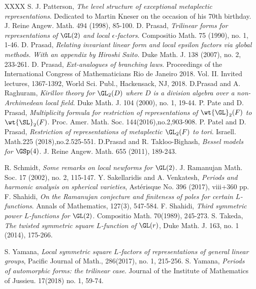 \documentclass[11pt,reqno]{amsart}
\theoremstyle{plain}
\theoremstyle{remark} \newtheorem{remark}[thm]{Remark}
\theoremstyle{definition} \newtheorem{exercise}[thm]{Exercise}
\theoremstyle{definition} \newtheorem{example}[thm]{Example} \newtheorem{condition}[thm]{Condition}
\numberwithin{equation}{section}
\renewcommand{\-}{\text{--}}
\begin{document}
\begin{thebibliography}{XXXX}
S. J. Patterson, \emph{The level structure of exceptional metaplectic representations}.
Dedicated to Martin Kneser on the occasion of his 70th birthday.
J. Reine Angew. Math. 494 (1998), 85-100.
D. Prasad, \emph{
Trilinear forms for representations of $\GL(2)$ and local $\epsilon$-factors}.
Compositio Math. 75 (1990), no. 1, 1-46.
 D. Prasad, {\em Relating invariant linear form and local epsilon factors via global methods. With an appendix by Hiroshi Saito.} Duke Math. J. 138 (2007), no. 2, 233-261.
D. Prasad, \emph{Ext-analogues of branching laws}.  Proceedings of the International Congress of Mathematicians Rio de Janeiro 2018. Vol. II. Invited lectures, 1367-1392, World Sci. Publ., Hackensack, NJ, 2018.
D.Prasad and A. Raghuram,\emph{
Kirillov theory for $\GL_2(D)$ where $D$ is a division algebra over a non-Archimedean local field}. Duke Math. J. 104 (2000), no. 1, 19-44.
P. Pate and D. Prasad, \emph{Multiplicity formula for restriction of representations of $\wt{\GL}_2(F)$ to $\wt{\SL}_2(F)$}. Proc. Amer.  Math. Soc. 144(2016),no.2,903-908.
P. Patel and D. Prasad, \emph{Restriction of representations of metaplectic $\GL_2(F)$ to tori}. Israell. Math.225 (2018),no.2.525-551.
D.Prasad and R. Takloo-Bighash,
\emph{Bessel models for $\GSp(4)$}. 
J. Reine Angew. Math. 655 (2011), 189-243.

R. Schmidt, \emph{Some remarks on local newforms for $\GL(2)$}. 
J. Ramanujan Math. Soc. 17 (2002), no. 2, 115-147.
 Y. Sakellaridis and A. Venkatesh, {\em Periods and harmonic analysis on spherical varieties}, Ast\'erisque No. 396 (2017), viii+360 pp.
F. Shahidi, \emph{On the Ramanujan conjecture and finiteness of poles for certain $L$-functions}. Annals of Mathematics, 127(3), 547-584. 
 F. Shahidi, {\em Third symmetric power $L$-functions for $\GL(2)$}. Compositio Math. 70(1989), 245-273.
 S. Takeda, {\em The twisted symmetric square $L$-function of $\GL(r)$}, Duke Math. J. 163, no. 1 (2014), 175-266.

 S. Yamana, {\em Local symmetric square $L$-factors of representations of general linear groups}, 	Pacific Journal of Math., 286(2017), no. 1, 215-256.
S. Yamana, \emph{Periods of automorphic forms: the trilinear case}. Journal of the Institute of Mathematics of Jussieu. 17(2018) no. 1, 59-74.


\end{thebibliography}
\end{document}

